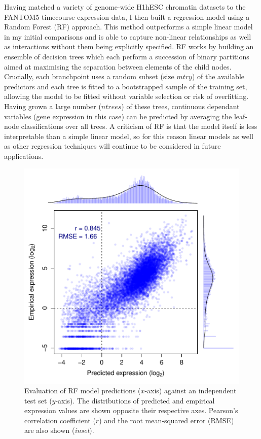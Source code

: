 \documentclass[a4paper]{report}
\begin{document}
Having matched a variety of genome-wide H1hESC chromatin datasets
to the FANTOM5 timecourse expression data, I then built a regression
model using a Random Forest (RF) approach.\cite{Breiman2001} This method outperforms a simple
linear model in my initial comparisons and is able to capture non-linear relationships as well
as interactions without them being explicitly specified.\cite{Diaz2006} RF works by
building an ensemble of decision trees which each perform a succession
of binary partitions aimed at maximising the separation between elements
of the child nodes.\cite{Svetnik2003} Crucially, each branchpoint uses a random subset
(size $mtry$) of the
available predictors and each tree is fitted to a bootstrapped sample of
the training set, allowing the model to
be fitted without variable selection or risk of
overfitting.\cite{Diaz2006, Dasgupta2012} Having grown a large number ($ntrees$)
of these
trees, continuous dependant variables (gene expression in
this case) can be predicted by averaging the leaf-node classifications
over all trees. A criticism of RF is that the model itself is less interpretable than
a simple linear model, so for this reason linear models as well as
other regression techniques will continue to be considered in future applications.  \\

\begin{figure}[!b]
\begin{center} 
\includegraphics[width=.9\textwidth]{figs/RandomForest_10CV_50d.pdf}
\captionsetup{width=.9\textwidth} 
\caption{Evaluation of RF model predictions ($x$-axis) against an independent
  test set ($y$-axis). The distributions of predicted and empirical
  expression values are shown opposite their
  respective axes. Pearson's correlation coefficient ($r$) and the root
  mean-squared error (RMSE) are also shown (\emph{inset}).
}\label{fig:model}
\end{center} 
\end{figure} 
\end{document}
